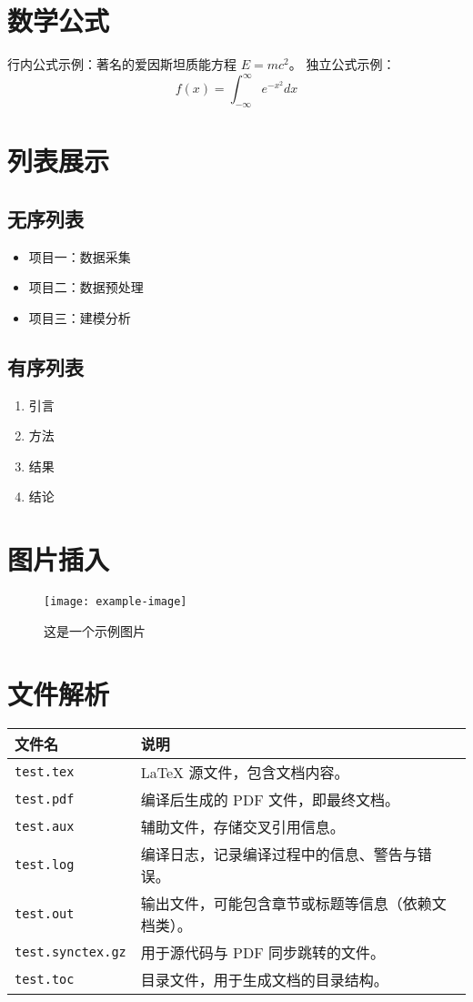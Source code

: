 \documentclass[12pt]{article}
\begin{document}
\section{数学公式}
行内公式示例：著名的爱因斯坦质能方程 $E = mc^2$。
独立公式示例：
\[
f(x) = \int_{-\infty}^{\infty} e^{-x^2} dx
\]
\section{列表展示}
\subsection{无序列表}
\begin{itemize}
    \item 项目一：数据采集
    \item 项目二：数据预处理
    \item 项目三：建模分析
\end{itemize}
\subsection{有序列表}
\begin{enumerate}
    \item 引言
    \item 方法
    \item 结果
    \item 结论
\end{enumerate}

\section{图片插入}
\begin{figure}[h]
    \centering
    \texttt{[image: example-image]}
    \caption{这是一个示例图片}
\end{figure}
\section{文件解析}
\begin{longtable}{@{}ll@{}}
    \toprule
    \textbf{文件名} & \textbf{说明} \\
    \midrule
    \texttt{test.tex} & LaTeX 源文件，包含文档内容。 \\
    \texttt{test.pdf} & 编译后生成的 PDF 文件，即最终文档。 \\
    \texttt{test.aux} & 辅助文件，存储交叉引用信息。 \\
    \texttt{test.log} & 编译日志，记录编译过程中的信息、警告与错误。 \\
    \texttt{test.out} & 输出文件，可能包含章节或标题等信息（依赖文档类）。 \\
    \texttt{test.synctex.gz} & 用于源代码与 PDF 同步跳转的文件。 \\
    \texttt{test.toc} & 目录文件，用于生成文档的目录结构。 \\
    \bottomrule
\end{longtable}
\end{document}
